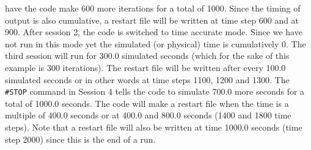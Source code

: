 have the code make 600 more iterations for a total of 1000.  Since the timing
of output is also cumulative, a restart file will be written at time step 600
and at 900.
After session 2, the code is switched to time accurate mode.  Since we
have not run in this mode yet the simulated (or physical) time is cumulatively
0.  The third session will run for 300.0 simulated seconds (which for the
sake of this example is 300 iterations).  The restart file will be written
after every 100.0 simulated seconds or in other words at time steps
1100, 1200 and 1300.
The {\tt \#STOP} command in Session 4  tells the code to simulate  700.0 more 
seconds for a total of 1000.0 seconds.  The code will make a restart file
when the time is a multiple of 400.0 seconds or at 400.0 and 800.0 seconds (1400 and
1800 time steps).  Note that a restart file will also be written at time 1000.0
seconds
(time step 2000) since this is the end of a run.

